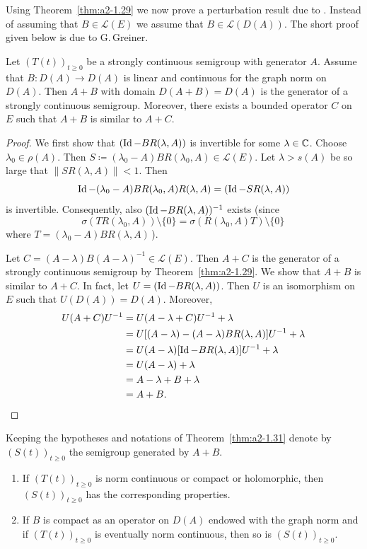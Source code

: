 Using Theorem~\ref{thm:a2-1.29}   we now prove a perturbation result due to \textcite{deschschappacher:1984}.
Instead of assuming that $B \in \mathcal{L}(E)$ we assume that $B \in \mathcal{L}(D(A))$.
The short proof given below is due to G.\,Greiner.
\begin{theorem}\label{thm:a2-1.31}
Let $(T(t))_{t \geq 0}$ be a strongly continuous semigroup with generator $A$.
Assume that $B \colon D(A) \to D(A)$ is linear and continuous for the graph norm on $D(A)$.
Then $A + B$ with domain $D(A + B) = D(A)$ is the generator of a strongly continuous semigroup.
Moreover, there exists a bounded operator $C$ on $E$ such that $A + B$ is similar to $A + C$.
\end{theorem}
\begin{proof}
We first show that $(\operatorname{Id} - BR(\lambda,A))$ is invertible for some $\lambda \in \mathbb{C}$.
Choose $\lambda_{0} \in \rho(A)$.
Then $S \coloneq (\lambda_{0}-A)BR(\lambda_{0},A) \in \mathcal{L}(E)$.
Let $\lambda > s(A)$ be so large that $\|SR(\lambda,A)\| < 1$.
Then 
\[
\operatorname{Id} - (\lambda_{0} - A)BR(\lambda_{0},A)R(\lambda,A) = (\operatorname{Id} - SR(\lambda,A))
\]
is invertible.
Consequently, also $(\operatorname{Id} -BR(\lambda,A))^{-1}$ exists
(since 
\[
\sigma(TR(\lambda_{0},A)) \setminus \{0\} 
= \sigma(R(\lambda_{0},A)T) \setminus \{0\}\,
\]
where  $T = (\lambda_{0}-A)BR(\lambda,A)\, $).

Let $C = (A-\lambda)B(A-\lambda)^{-1} \in \mathcal{L}(E)$.
Then $A + C$ is the generator of a strongly continuous semigroup by Theorem~\ref{thm:a2-1.29}. 
We show that $A + B$ is similar to $A + C$.
In fact, let $U = (\operatorname{Id} - BR(\lambda,A))$.
Then $U$ is an isomorphism on $E$ such that $U(D(A)) = D(A)$. Moreover,
\begin{align*}		
U(A+C)U^{-1} &= U(A - \lambda+C)U^{-1} + \lambda \\
&= U[(A - \lambda) - (A-\lambda)BR(\lambda,A)]U^{-1} + \lambda \\
&= U(A - \lambda)[\Id - BR(\lambda,A)]U^{-1} + \lambda \\
&= U(A - \lambda) + \lambda \\
&= A - \lambda + B + \lambda \\
&= A + B.	\tag*{\qedsymbol}%
\end{align*}
\let\qedsymbol\relax
\end{proof}
\begin{corollary}\label{cor:a2-1.32}
Keeping the hypotheses and notations of Theorem~\ref{thm:a2-1.31} denote by 
$(S(t))_{t\geq 0}$ the semigroup generated by $A+B$.
\begin{enumerate}[\upshape(i)]
\item
If\/ $(T(t))_{t\geq 0}$ is norm continuous or compact or holomorphic, then $(S(t))_{t\geq 0}$ has the corresponding properties.

\item
If\/ $B$ is compact as an operator on $D(A)$ endowed with the graph norm and if\/ $(T(t))_{t\geq 0}$ is eventually norm continuous, then so is $(S(t))_{t\geq 0}$.
\end{enumerate}
\end{corollary}
